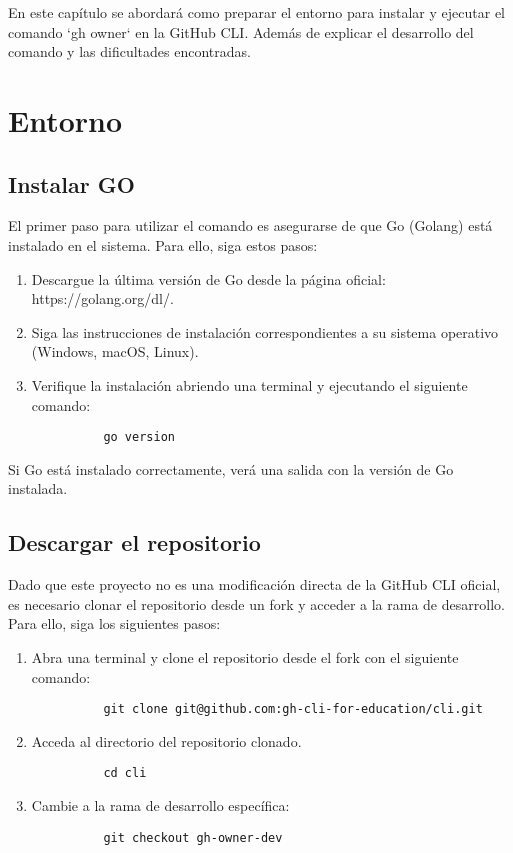 En este capítulo se abordará como preparar el entorno para instalar y ejecutar el comando `gh owner` en la GitHub CLI. Además de explicar el desarrollo del comando y las dificultades encontradas.

\section{Entorno}
\subsection{Instalar GO}
El primer paso para utilizar el comando es asegurarse de que Go (Golang) está instalado en el sistema. Para ello, siga estos pasos:

\begin{enumerate}
  \item Descargue la última versión de Go desde la página oficial: https://golang.org/dl/.
  \item Siga las instrucciones de instalación correspondientes a su sistema operativo (Windows, macOS, Linux).
  \item Verifique la instalación abriendo una terminal y ejecutando el siguiente comando:
        \begin{verbatim}
          go version
        \end{verbatim}
\end{enumerate}

Si Go está instalado correctamente, verá una salida con la versión de Go instalada.

\subsection{Descargar el repositorio}

Dado que este proyecto no es una modificación directa de la GitHub CLI oficial, es necesario clonar el repositorio desde un fork y acceder a la rama de desarrollo. Para ello, siga los siguientes pasos:

\begin{enumerate}
  \item Abra una terminal y clone el repositorio desde el fork con el siguiente comando:
        \begin{verbatim}
          git clone git@github.com:gh-cli-for-education/cli.git
        \end{verbatim}
  \item Acceda al directorio del repositorio clonado.
        \begin{verbatim}
          cd cli
        \end{verbatim}
  \item Cambie a la rama de desarrollo específica:
        \begin{verbatim}
          git checkout gh-owner-dev
        \end{verbatim}
\end{enumerate}


